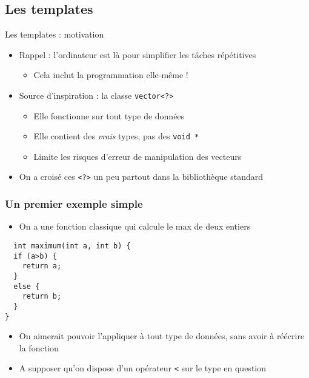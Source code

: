 
\subsection{Les templates}

\begin{frame}[t]{Les templates : motivation}
  \begin{itemize}
    \item Rappel : l'ordinateur est là pour simplifier les tâches répétitives
    \begin{itemize}
      \item Cela inclut la programmation elle-même !
    \end{itemize}
    \item Source d'inspiration : la classe \texttt{vector<?>}
    \begin{itemize}
      \item Elle fonctionne sur tout type de données
      \item Elle contient des \emph{vrais} types, pas des \texttt{void *}
      \item Limite les risques d'erreur de manipulation des vecteurs
    \end{itemize}
    \item On a croisé ces \texttt{<?>} un peu partout dans la bibliothèque standard
  \end{itemize}
\end{frame}


\begin{frame}[fragile]\frametitle{Un premier exemple simple}
  \begin{itemize}
    \item On a une fonction classique qui calcule le max de deux entiers
    \end{itemize}
\begin{lstlisting}
  int maximum(int a, int b) {
  if (a>b) {
    return a;
  }
  else {
    return b;
  }
}
  \end{lstlisting}
  \begin{itemize}
\item On aimerait pouvoir l'appliquer à tout type de données, sans avoir à réécrire la fonction
\item A supposer qu'on dispose d'un opérateur \texttt{<} sur le type en question
  \end{itemize}
\end{frame}

